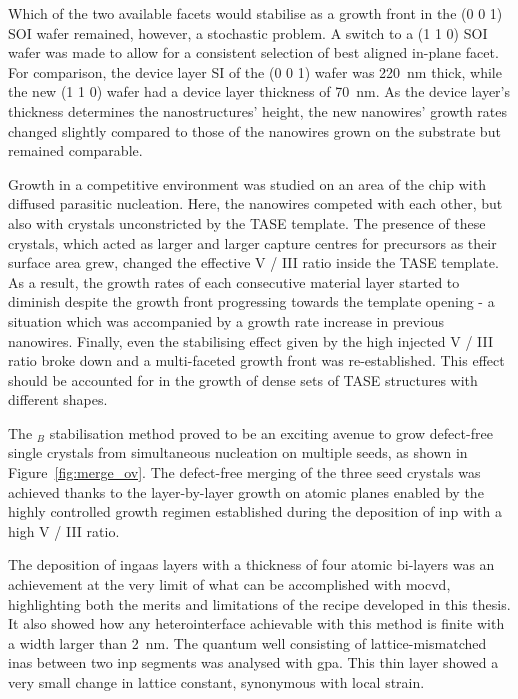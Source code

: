 Which of the two available  facets would stabilise as a growth front in the \hkl(0 0 1) \acf{SOI} wafer remained, however, a stochastic problem. A switch to a \hkl(1 1 0) \acs{SOI} wafer was made to allow for a consistent selection of best aligned  in-plane facet. For comparison, the device layer \acl{SI} of the \hkl(0 0 1) wafer was \qty{220}{\nano\metre} thick, while the new \hkl(1 1 0) wafer had a device layer thickness of \qty{70}{\nano\metre}. As the device layer's thickness determines the nanostructures' height, the new nanowires' growth rates changed slightly compared to those of the nanowires grown on the  substrate but remained comparable.

Growth in a competitive environment was studied on an area of the chip with diffused parasitic nucleation. Here, the nanowires competed with each other, but also with crystals unconstricted by the \acs{TASE} template. The presence of these crystals, which acted as larger and larger capture centres for precursors as their surface area grew, changed the effective V / III ratio inside the \acs{TASE} template. As a result, the growth rates of each consecutive material layer started to diminish despite the growth front progressing towards the template opening - a situation which was accompanied by a growth rate increase in previous nanowires. Finally, even the stabilising effect given by the high injected V / III ratio broke down and a multi-faceted growth front was re-established. This effect should be accounted for in the growth of dense sets of \acs{TASE} structures with different shapes.

The \(_B\) stabilisation method proved to be an exciting avenue to grow defect-free single crystals from simultaneous nucleation on multiple seeds, as shown in Figure~\ref{fig:merge_ov}. The defect-free merging of the three seed crystals was achieved thanks to the layer-by-layer growth on  atomic planes enabled by the highly controlled growth regimen established during the deposition of \acs{inp} with a high V / III ratio.

The deposition of \acs{ingaas} layers with a thickness of four atomic bi-layers was an achievement at the very limit of what can be accomplished with \acf{mocvd}, highlighting both the merits and limitations of the recipe developed in this thesis. It also showed how any heterointerface achievable with this method is finite with a width larger than \qty{2}{\nano\metre}. The quantum well consisting of lattice-mismatched \acf{inas} between two \acs{inp} segments was analysed with \acf{gpa}. This thin layer showed a very small change in lattice constant, synonymous with local strain.

